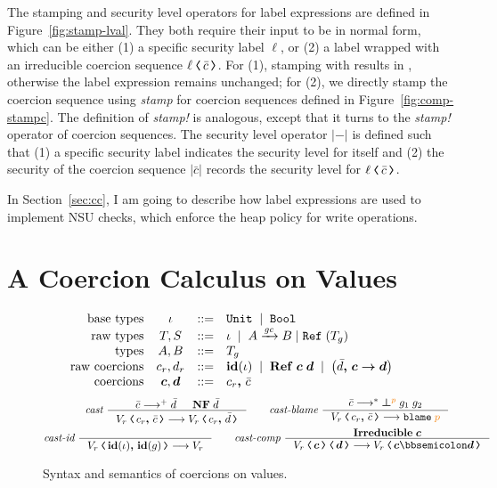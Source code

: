 The stamping and security level operators for label expressions are defined in
Figure~\ref{fig:stamp-lval}. They both require their input to be in normal form,
which can be either (1) a specific security label $\ell$, or (2) a label wrapped
with an irreducible coercion sequence $\cccast{\ell}{\bar{c}}$. For (1),
stamping \low with \high results in \cccast{\low}{\up}, otherwise the label
expression remains unchanged; for (2), we directly stamp the coercion sequence
using \textit{stamp} for coercion sequences defined in
Figure~\ref{fig:comp-stampc}. The definition of \textit{stamp!} is analogous,
except that it turns to the \textit{stamp!} operator of coercion sequences. The
security level operator $|{-}|$ is defined such that (1) a specific security
label indicates the security level for itself and (2) the security of the
coercion sequence $|\bar{c}|$ records the security level for
$\cccast{\ell}{\bar{c}}$.

In Section~\ref{sec:cc}, I am going to describe how label expressions are used
to implement NSU checks, which enforce the heap policy for write operations.

\section{A Coercion Calculus on Values}
\label{sec:coercion-calc-values}

\begin{figure}[tbp]
\raggedright
  \[
  \begin{array}{rcll}
    \text{base types}               & \iota     & ::= & \mathtt{Unit} \;\mid\; \mathtt{Bool} \\
    \text{raw types}                & T, S      & ::= & \iota \;\mid\; {A}\xrightarrow{{\mathit{gc}}}{B} \mid \mathtt{Ref}\;{(T_g)} \\
    \text{types}                    & A, B      & ::= & T_g \\
    \text{raw coercions}            & c_r, d_r  & ::=  & \mathit{\mathbf{id}}(\iota) \;\mid\; \mathbf{Ref}\;{\bm{c}}\;{\bm{d}} \;\mid\; \left( {\bar{d}}\boldsymbol{,}\,{\bm{c}}\boldsymbol{\rightarrow}{\bm{d}} \right) \\
    \text{coercions}                & \bm{c}, \bm{d} & ::= & {c_r}\boldsymbol{,}\,{\bar{c}}
  \end{array}
  \]
  { \small
  \begin{gather*}
  \textit{cast}~
  \inference{\bar{c} \longrightarrow^{+} \bar{d} & \mathbf{NF} \; \bar{d}}
  {\cccast{V_r}{\coerc{c_r}{\bar{c}}} \longrightarrow \cccast{V_r}{\coerc{c_r}{\bar{d}}}}
  \qquad
  \textit{cast-blame}~
  \inference{\bar{c} \longrightarrow^{*} \err{g_1}{g_2}{p}}
  {\cccast{V_r}{\coerc{c_r}{\bar{c}}} \longrightarrow \blame{p}}
  \\
  \textit{cast-id}~
  \inference{}{\cccast{V_r}{\coerc{\id{\iota}}{\id{g}}} \longrightarrow V_r}
  \qquad
  \textit{cast-comp}~
  \inference{\mathbf{Irreducible} \; \bm{c}}
  {\cccast{\cccast{V_r}{\bm{c}}}{\bm{d}} \longrightarrow \cccast{V_r}{\bm{c} \mdoubleplus \bm{d}}}
  \end{gather*}}
  \caption{Syntax and semantics of coercions on values.}
  \label{fig:coercions}
\end{figure}

